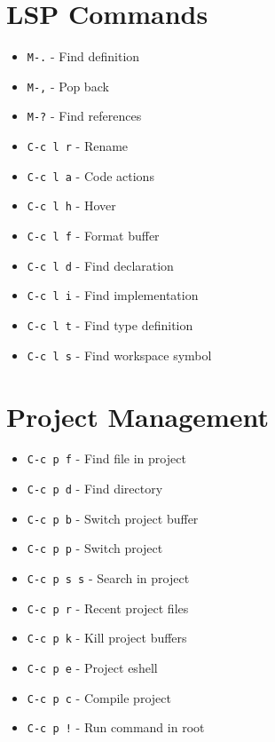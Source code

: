 \documentclass[6pt,landscape]{article}
\newcommand{\key}[1]{\texttt{#1}}
\begin{document}
\begin{multicols*}{5}
\section*{LSP Commands}
\begin{itemize}[leftmargin=*,itemsep=0pt,parsep=0pt,topsep=0pt]
\item \key{M-.} - Find definition
\item \key{M-,} - Pop back
\item \key{M-?} - Find references
\item \key{C-c l r} - Rename
\item \key{C-c l a} - Code actions
\item \key{C-c l h} - Hover
\item \key{C-c l f} - Format buffer
\item \key{C-c l d} - Find declaration
\item \key{C-c l i} - Find implementation
\item \key{C-c l t} - Find type definition
\item \key{C-c l s} - Find workspace symbol
\end{itemize}

\section*{Project Management}
\begin{itemize}[leftmargin=*,itemsep=0pt,parsep=0pt,topsep=0pt]
\item \key{C-c p f} - Find file in project
\item \key{C-c p d} - Find directory
\item \key{C-c p b} - Switch project buffer
\item \key{C-c p p} - Switch project
\item \key{C-c p s s} - Search in project
\item \key{C-c p r} - Recent project files
\item \key{C-c p k} - Kill project buffers
\item \key{C-c p e} - Project eshell
\item \key{C-c p c} - Compile project
\item \key{C-c p !} - Run command in root
\end{itemize}


\end{multicols*}
\end{document}

